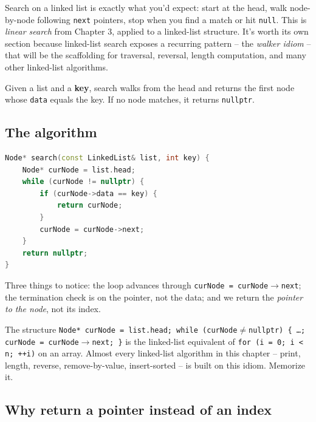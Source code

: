 \documentclass[11pt]{article}
\begin{document}
Search on a linked list is exactly what you'd expect: start at the
head, walk node-by-node following \texttt{next} pointers, stop when
you find a match or hit \texttt{null}. This is \emph{linear search}
from Chapter 3, applied to a linked-list structure. It's worth its
own section because linked-list search exposes a recurring pattern
-- the \emph{walker idiom} -- that will be the scaffolding for
traversal, reversal, length computation, and many other linked-list
algorithms.

\begin{defnbox}
Given a list and a \textbf{key}, search walks from the head and
returns the first node whose \texttt{data} equals the key. If no
node matches, it returns \texttt{nullptr}.
\end{defnbox}

\subsection{The algorithm}

\begin{examplebox}
\begin{lstlisting}[basicstyle=\ttfamily\small,frame=single,language=C++]
Node* search(const LinkedList& list, int key) {
    Node* curNode = list.head;
    while (curNode != nullptr) {
        if (curNode->data == key) {
            return curNode;
        }
        curNode = curNode->next;
    }
    return nullptr;
}
\end{lstlisting}
Three things to notice: the loop advances through
\texttt{curNode = curNode$\to$next}; the termination check is on
the pointer, not the data; and we return the \emph{pointer to the
node}, not its index.
\end{examplebox}

\begin{ideabox}
The structure \texttt{Node* curNode = list.head; while
(curNode$\neq$nullptr) \{ \ldots; curNode = curNode$\to$next; \}} is
the linked-list equivalent of \texttt{for (i = 0; i < n; ++i)} on
an array. Almost every linked-list algorithm in this chapter --
print, length, reverse, remove-by-value, insert-sorted -- is built
on this idiom. Memorize it.
\end{ideabox}

\subsection{Why return a pointer instead of an index}
\end{document}
